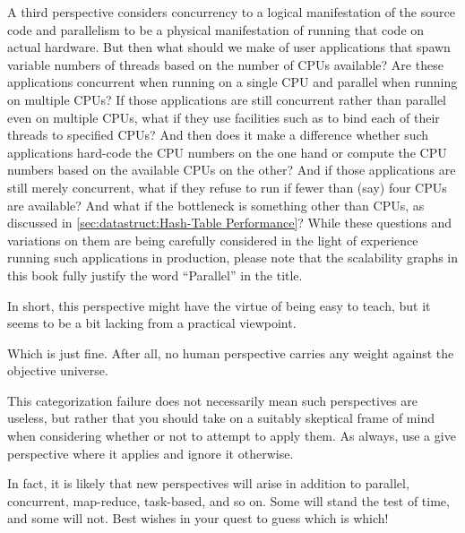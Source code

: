 A third perspective considers concurrency to a logical manifestation of
the source code and parallelism to be a physical manifestation of running
that code on actual hardware.
But then what should we make of user applications that spawn variable
numbers of threads based on the number of CPUs available?
Are these applications concurrent when running on a single CPU and
parallel when running on multiple CPUs?
If those applications are still concurrent rather than parallel
even on multiple CPUs, what if they use facilities such as
 to bind each of their threads to specified CPUs?
And then does it make a difference whether such applications hard-code
the CPU numbers on the one hand or compute the CPU numbers based on
the available CPUs on the other?
And if those applications are still merely concurrent, what if they
refuse to run if fewer than (say) four CPUs are available?
And what if the bottleneck is something other than CPUs, as discussed in
\cref{sec:datastruct:Hash-Table Performance}?
While these questions and variations on them are being carefully
considered in the light of experience running such applications in
production, please note that the scalability graphs in this book fully
justify the word ``Parallel'' in the title.

In short, this perspective might have the virtue of being easy to teach,
but it seems to be a bit lacking from a practical viewpoint.

Which is just fine.
After all, no human perspective carries any weight against the objective
universe.

This categorization failure does not necessarily mean such perspectives
are useless, but rather that you should take on a suitably skeptical
frame of mind when considering whether or not to attempt to apply them.
As always, use a give perspective where it applies and ignore it otherwise.

In fact, it is likely that new perspectives will arise in addition
to parallel, concurrent, map-reduce, task-based, and so on.
Some will stand the test of time, and some will not.
Best wishes in your quest to guess which is which!
